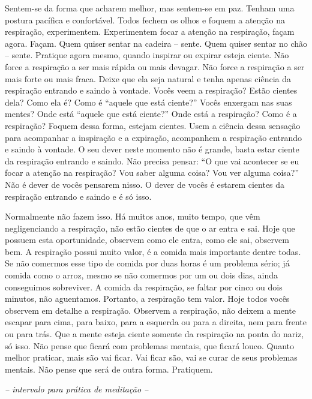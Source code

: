 Sentem-se da forma que acharem melhor, mas sentem-se em paz. Tenham
uma postura pacífica e confortável. Todos fechem os olhos e foquem a
atenção na respiração, experimentem. Experimentem focar a atenção na
respiração, façam agora. Façam. Quem quiser sentar na cadeira – sente.
Quem quiser sentar no chão – sente. Pratique agora mesmo, quando
inspirar ou expirar esteja ciente. Não force a respiração a ser mais
rápida ou mais devagar. Não force a respiração a ser mais forte ou mais
fraca. Deixe que ela seja natural e tenha apenas ciência da respiração
entrando e saindo à vontade. Vocês veem a respiração? Estão cientes
dela? Como ela é? Como é “aquele que está ciente?” Vocês enxergam nas
suas mentes? Onde está “aquele que está ciente?” Onde está a
respiração? Como é a respiração? Foquem dessa forma, estejam cientes.
Usem a ciência dessa sensação para acompanhar a inspiração e a
expiração, acompanhem a respiração entrando e saindo à vontade. O seu
dever neste momento não é grande, basta estar ciente da respiração
entrando e saindo. Não precisa pensar: “O que vai acontecer se eu focar
a atenção na respiração? Vou saber alguma coisa? Vou ver alguma coisa?”
Não é dever de vocês pensarem nisso. O dever de vocês é estarem cientes
da respiração entrando e saindo e é só isso.

Normalmente não fazem isso. Há muitos anos, muito tempo, que vêm
negligenciando a respiração, não estão cientes de que o ar entra e sai.
Hoje que possuem esta oportunidade, observem como ele entra, como ele
sai, observem bem. A respiração possui muito valor, é a comida mais
importante dentre todas. Se não comermos esse tipo de comida por duas
horas é um problema sério; já comida como o arroz, mesmo se não
comermos por um ou dois dias, ainda conseguimos sobreviver. A comida da
respiração, se faltar por cinco ou dois minutos, não aguentamos.
Portanto, a respiração tem valor. Hoje todos vocês observem em detalhe
a respiração. Observem a respiração, não deixem a mente escapar para
cima, para baixo, para a esquerda ou para a direita, nem para frente ou
para trás. Que a mente esteja ciente somente da respiração na ponta do
nariz, só isso. Não pense que ficará com problemas mentais, que ficará
louco. Quanto melhor praticar, mais são vai ficar. Vai ficar são, vai
se curar de seus problemas mentais. Não pense que será de outra forma.
Pratiquem.

{\itshape -- intervalo para prática de meditação --}

